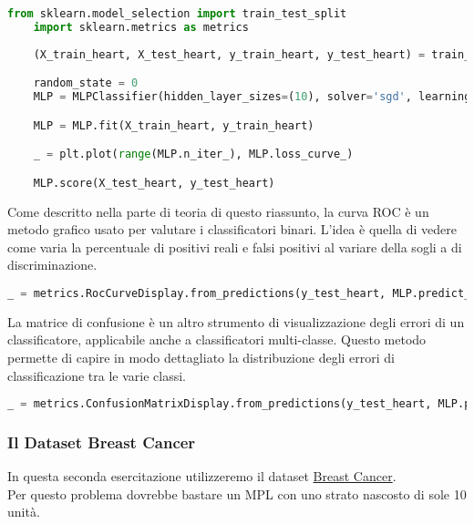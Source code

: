 \begin{lstlisting}[language=Python, caption=Importazione delle Librerie e Apprendimento con Funzione di Costo]
    from sklearn.model_selection import train_test_split
    import sklearn.metrics as metrics
    
    (X_train_heart, X_test_heart, y_train_heart, y_test_heart) = train_test_split(heart_disease_samples, heart_disease_targets)

    random_state = 0
    MLP = MLPClassifier(hidden_layer_sizes=(10), solver='sgd', learning_rate_init=0.0005, max_iter=1000, random_state=random_state)

    MLP = MLP.fit(X_train_heart, y_train_heart)

    _ = plt.plot(range(MLP.n_iter_), MLP.loss_curve_)

    MLP.score(X_test_heart, y_test_heart)
\end{lstlisting}

Come descritto nella parte di teoria di questo riassunto, la curva ROC è un metodo grafico usato per valutare i classificatori binari. L'idea è quella di vedere come varia la percentuale di positivi reali e falsi positivi al variare della sogli a di discriminazione.

\begin{lstlisting}[language=Python, caption=Curva ROC e AUC]
    _ = metrics.RocCurveDisplay.from_predictions(y_test_heart, MLP.predict_proba(X_test_heart)[:, 1])
\end{lstlisting}

La matrice di confusione è un altro strumento di visualizzazione degli errori di un classificatore, applicabile anche a classificatori multi-classe. Questo metodo permette di capire in modo dettagliato la distribuzione degli errori di classificazione tra le varie classi.

\begin{lstlisting}[language=Python, caption=Rappresentazione Grafica della Matrice di Confusione]
    _ = metrics.ConfusionMatrixDisplay.from_predictions(y_test_heart, MLP.predict(X_test_heart))
\end{lstlisting}

\subsubsection{Il Dataset Breast Cancer}
In questa seconda esercitazione utilizzeremo il dataset \href{https://archive.ics.uci.edu/ml/datasets/breast+cancer+wisconsin+(diagnostic)}{Breast Cancer}.\\
Per questo problema dovrebbe bastare un MPL con uno strato nascosto di sole 10 unità.

